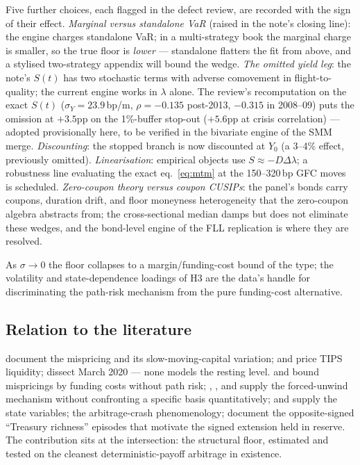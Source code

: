 \documentclass[11pt]{article}
\begin{document}
Five further choices, each flagged in the defect review, are recorded with the sign of their effect. \emph{Marginal versus standalone VaR} (raised in the note's closing line): the engine charges standalone VaR; in a multi-strategy book the marginal charge is smaller, so the true floor is \emph{lower} --- standalone flatters the fit from above, and a stylised two-strategy appendix will bound the wedge. \emph{The omitted yield leg}: the note's $S(t)$ has two stochastic terms with adverse comovement in flight-to-quality; the current engine works in $\lambda$ alone. The review's recomputation on the exact $S(t)$ ($\sigma_Y=23.9$\,bp/m, $\rho=-0.135$ post-2013, $-0.315$ in 2008--09) puts the omission at $+3.5$pp on the 1\%-buffer stop-out ($+5.6$pp at crisis correlation) --- adopted provisionally here, to be verified in the bivariate engine of the SMM merge. \emph{Discounting}: the stopped branch is now discounted at $Y_0$ (a 3--4\% effect, previously omitted). \emph{Linearisation}: empirical objects use $S\approx-D\Delta\lambda$; a robustness line evaluating the exact eq.~\eqref{eq:mtm} at the 150--320\,bp GFC moves is scheduled. \emph{Zero-coupon theory versus coupon CUSIPs}: the panel's bonds carry coupons, duration drift, and floor moneyness heterogeneity that the zero-coupon algebra abstracts from; the cross-sectional median damps but does not eliminate these wedges, and the bond-level engine of the FLL replication is where they are resolved.

As $\sigma\to0$ the floor collapses to a margin/funding-cost bound of the \citet{gp2011} type; the volatility and state-dependence loadings of H3 are the data's handle for discriminating the path-risk mechanism from the pure funding-cost alternative.

\subsection{Relation to the literature}\label{sec:lit}

\citet{fll2014} document the mispricing and its slow-moving-capital variation; \citet{dkw2018} and \citet{cg2022} price TIPS liquidity; \citet{hns2022} dissect March 2020 --- none models the resting level. \citet{gp2011} and \citet{tuckmanvila1992} bound mispricings by funding costs without path risk; \citet{shleifervishny1997}, \citet{liulongstaff2004}, \citet{kondor2009} and \citet{gromb2010} supply the forced-unwind mechanism without confronting a specific basis quantitatively; \citet{hkm2017} and \citet{duffie2010} supply the state variables; \citet{mp2012} the arbitrage-crash phenomenology; \citet{fl2024} document the opposite-signed ``Treasury richness'' episodes that motivate the signed extension held in reserve. The contribution sits at the intersection: the structural floor, estimated and tested on the cleanest deterministic-payoff arbitrage in existence.
\end{document}
